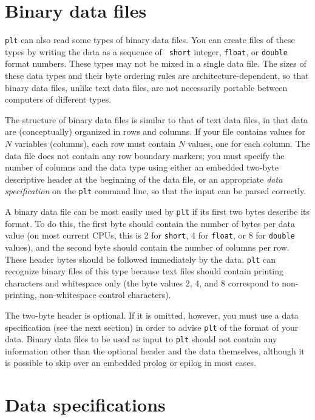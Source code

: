 \documentclass{book}
\begin{document}
\section{Binary data files}

{\tt plt} can also read some types of binary data files.  You can
create files of these types by writing the data as a sequence of {\tt
short} integer, {\tt float}, or {\tt double} format numbers.  These
types may not be mixed in a single data file.  The sizes of these data
types and their byte ordering rules are architecture-dependent, so
that binary data files, unlike text data files, are not necessarily
portable between computers of different types.

The structure of binary data files is similar to that of text data
files, in that data are (conceptually) organized in rows and columns.
If your file contains values for $N$ variables (columns), each row
must contain $N$ values, one for each column.  The data file does not
contain any row boundary markers; you must specify the number of
columns and the data type using either an embedded two-byte
descriptive header at the beginning of the data file, or an
appropriate {\em data specification} on the {\tt plt} command line, so
that the input can be parsed correctly.

A binary data file can be most easily used by {\tt plt} if its first
two bytes describe its format.  To do this, the first byte should
contain the number of bytes per data value (on most current CPUs, this
is 2 for {\tt short}, 4 for {\tt float}, or 8 for {\tt double}
values), and the second byte should contain the number of columns per
row.  These header bytes should be followed immediately by the data.
{\tt plt} can recognize binary files of this type because text files
should contain printing characters and whitespace only (the byte
values 2, 4, and 8 correspond to non-printing, non-whitespace control
characters).

The two-byte header is optional.  If it is omitted, however, you must
use a data specification (see the next section) in order to advise
{\tt plt} of the format of your data.  Binary data files to be used as
input to {\tt plt} should not contain any information other than the
optional header and the data themselves, although it is possible to
skip over an embedded prolog or epilog in most cases.

\section{Data specifications \label{sec:data-spec}}
\end{document}
